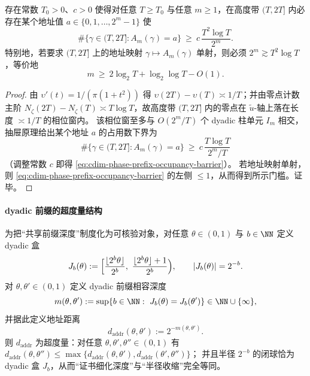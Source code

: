\begin{proposition}[二次分辨率屏障的占用下界与单射门槛]\label{prop:cdim-phase-prefix-occupancy-barrier}
存在常数 \(T_0>0\)、\(c>0\) 使得对任意 \(T\ge T_0\) 与任意 \(m\ge 1\)，在高度带 \((T,2T]\) 内必存在某个地址值 \(a\in\{0,1,\dots,2^m-1\}\) 使
\begin{equation}\label{eq:cdim-phase-prefix-occupancy-barrier}
\#\{\gamma\in(T,2T]:A_m(\gamma)=a\}\ \ge\ c\,\frac{T^2\log T}{2^m}.
\end{equation}
特别地，若要求 \((T,2T]\) 上的地址映射 \(\gamma\mapsto A_m(\gamma)\) 单射，则必须 \(2^m\gtrsim T^2\log T\)，等价地
\[
m\ \ge\ 2\log_2T+\log_2\log T-O(1).
\]
\end{proposition}
\begin{proof}
由 \(\upsilon'(t)=1/(\pi(1+t^2))\) 得 \(\upsilon(2T)-\upsilon(T)\asymp 1/T\)；并由零点计数主阶 \(N_\zeta(2T)-N_\zeta(T)\asymp T\log T\)，故高度带 \((T,2T]\) 内的零点在 \(\widetilde u\)-轴上落在长度 \(\asymp 1/T\) 的相位窗内。
该相位窗至多与 \(O(2^m/T)\) 个 dyadic 柱单元 \(I_m\) 相交，抽屉原理给出某个地址 \(a\) 的占用数下界为
\[
\#\{\gamma\in(T,2T]:A_m(\gamma)=a\}\ \ge\ c\,\frac{T\log T}{2^m/T}
\]
（调整常数 \(c\) 即得 \eqref{eq:cdim-phase-prefix-occupancy-barrier}）。
若地址映射单射，则 \eqref{eq:cdim-phase-prefix-occupancy-barrier} 的左侧 \(\le 1\)，从而得到所示门槛。证毕。
\end{proof}

\paragraph{dyadic 前缀的超度量结构}
为把“共享前缀深度”制度化为可核验对象，对任意 \(\theta\in(0,1)\) 与 \(b\in\NN\) 定义 dyadic 盒
\[
J_b(\theta):=\Bigl[\frac{\lfloor 2^b\theta\rfloor}{2^b},\ \frac{\lfloor 2^b\theta\rfloor+1}{2^b}\Bigr),
\qquad
|J_b(\theta)|=2^{-b}.
\]
对 \(\theta,\theta'\in(0,1)\) 定义 dyadic 前缀相容深度
\[
m(\theta,\theta'):=\sup\{b\in\NN:\ J_b(\theta)=J_b(\theta')\}\in\NN\cup\{\infty\},
\]
并据此定义地址距离
\[
d_{\mathrm{addr}}(\theta,\theta'):=2^{-m(\theta,\theta')}.
\]
则 \(d_{\mathrm{addr}}\) 为超度量：对任意 \(\theta,\theta',\theta''\in(0,1)\) 有
\(
d_{\mathrm{addr}}(\theta,\theta'')\le \max\{d_{\mathrm{addr}}(\theta,\theta'),d_{\mathrm{addr}}(\theta',\theta'')\}
\)；
并且半径 \(2^{-b}\) 的闭球恰为 dyadic 盒 \(J_b\)，从而“证书细化深度”与“半径收缩”完全等同。





